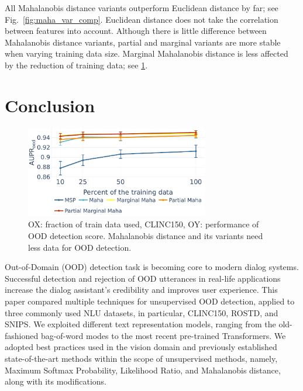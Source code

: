 \documentclass[letterpaper, final]{article} %
\begin{document}
All Mahalanobis distance variants outperform Euclidean distance by far; see Fig.~\ref{fig:maha_var_comp}. Euclidean distance does not take the correlation between features into account. Although there is little difference between Mahalanobis distance variants, partial and marginal variants are more stable when varying training data size.  Marginal Mahalanobis distance is less affected by the reduction of training data; see \ref{fig:dataset_size_var}. 




 




\section{Conclusion}
%
\begin{figure}[t]
    \centering
    \includegraphics[width=8cm, keepaspectratio]{aupr_clinc_diff_sizes.pdf}
    \caption{OX: fraction of train data used, CLINC150, OY: performance of OOD detection score. Mahalanobis distance and its variants need less data for OOD detection.}
    \label{fig:dataset_size_var}
\end{figure}

Out-of-Domain (OOD) detection task is becoming core to modern dialog systems. Successful detection and rejection of OOD utterances in real-life applications increase the dialog assistant's credibility and improves user experience. This paper compared multiple techniques for unsupervised OOD detection, applied to three commonly used NLU datasets, in particular, CLINC150, ROSTD, and SNIPS. We exploited different text representation models, ranging from the old-fashioned bag-of-word modes to the most recent pre-trained Transformers. We adopted best practices used in the vision domain and previously established state-of-the-art methods within the scope of unsupervised methods, namely, Maximum Softmax Probability, Likelihood Ratio, and Mahalanobis distance, along with its modifications.  
\end{document}
